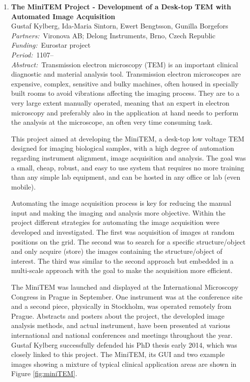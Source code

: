 \documentclass[10pt, a4paper]{article}
\newcommand{\aabstract}[1]{\emph{Abstract:~}#1}
\newcommand{\ffunding}[1]{\emph{Funding:~}#1\\}
\newcommand{\ppartners}[1]{\emph{Partners:~}#1\\}
\newcommand{\pperiod}[1]{\emph{Period:~}#1\\}
\begin{document}
{\begin{enumerate}
\item
\label{proj:PVS1}
\textbf{The MiniTEM Project - Development of a Desk-top TEM with Automated Image Acquisition}\\ 
Gustaf Kylberg, Ida-Maria Sintorn, Ewert Bengtsson, Gunilla Borgefors\\
\ppartners{Vironova AB; Delong Instruments, Brno, Czech Republic}
\ffunding{Eurostar project}
\pperiod{1107--}
\aabstract{Transmission electron microscopy (TEM) is an important clinical diagnostic and material analysis tool. Transmission electron microscopes are expensive, complex, sensitive and bulky machines, often housed in specially built rooms to avoid vibrations affecting the imaging process. They are to a very large extent manually operated, meaning that an expert in electron microscopy and preferably also in the  application at hand needs to perform the analysis at the microscope, an often very time consuming task. 
	
This project aimed at developing the MiniTEM, a desk-top low voltage TEM designed for imaging biological samples, with a high degree of automation regarding instrument alignment, image acquisition and analysis. The goal was a small, cheap, robust, and easy to use system that requires no more training than any simple lab equipment, and can be hosted in any office or lab (even mobile).
	
Automating the image acquisition process is key for reducing the manual input and making the imaging and analysis more objective. Within the project different strategies for automating the image acquisition were developed and investigated. The first was acquisition of images at random positions on the grid. The second was to search for a specific structure/object and only acquire (store) the images containing the structure/object of interest. The third was similar to the second approach but embedded in a multi-scale approach with the goal to make the acquisition more efficient.
	
The MiniTEM was launched and displayed at the International Microscopy Congress in Prague in September. One instrument was at the conference site and a second piece, physically in Stockholm, was operated remotely from Prague. Abstracts and posters about the project, the developled image analysis methods, and actual instrument, have been presented at various international and national conferences and meetings throughout the year. Gustaf Kylberg successfully defended his PhD thesis early 2014, which was closely linked to this project. The MiniTEM, its GUI and two example images showing a mixture of typical clinical application areas are shown in Figure \ref{fig:miniTEM}.}


\end{enumerate}}
\end{document}
